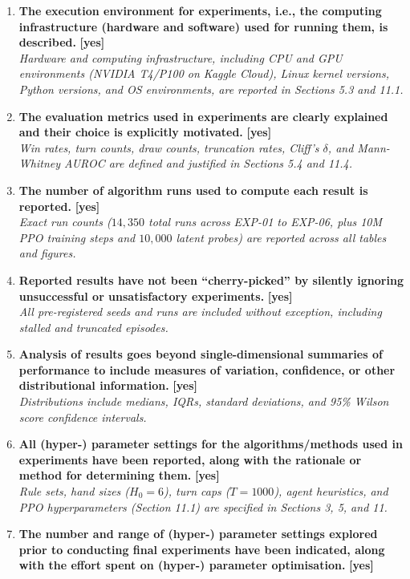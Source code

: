 \documentclass[11pt]{article}
\begin{document}
\begin{enumerate}
  \textit{RNG isolation via Python's Mersenne Twister with explicit seed schedules (10000--60099) detailed in Section 5.}
  \item \textbf{The execution environment for experiments, i.e., the computing infrastructure (hardware and software) used for running them, is described.} \hfill \textbf{[yes]} \\
  \textit{Hardware and computing infrastructure, including CPU and GPU environments (NVIDIA T4/P100 on Kaggle Cloud), Linux kernel versions, Python versions, and OS environments, are reported in Sections 5.3 and 11.1.}
  \item \textbf{The evaluation metrics used in experiments are clearly explained and their choice is explicitly motivated.} \hfill \textbf{[yes]} \\
  \textit{Win rates, turn counts, draw counts, truncation rates, Cliff's $\delta$, and Mann-Whitney AUROC are defined and justified in Sections 5.4 and 11.4.}
  \item \textbf{The number of algorithm runs used to compute each result is reported.} \hfill \textbf{[yes]} \\
  \textit{Exact run counts ($14{,}350$ total runs across EXP-01 to EXP-06, plus 10M PPO training steps and $10{,}000$ latent probes) are reported across all tables and figures.}
  \item \textbf{Reported results have not been ``cherry-picked'' by silently ignoring unsuccessful or unsatisfactory experiments.} \hfill \textbf{[yes]} \\
  \textit{All pre-registered seeds and runs are included without exception, including stalled and truncated episodes.}
  \item \textbf{Analysis of results goes beyond single-dimensional summaries of performance to include measures of variation, confidence, or other distributional information.} \hfill \textbf{[yes]} \\
  \textit{Distributions include medians, IQRs, standard deviations, and 95\% Wilson score confidence intervals.}
  \item \textbf{All (hyper-) parameter settings for the algorithms/methods used in experiments have been reported, along with the rationale or method for determining them.} \hfill \textbf{[yes]} \\
  \textit{Rule sets, hand sizes ($H_0=6$), turn caps ($T=1000$), agent heuristics, and PPO hyperparameters (Section 11.1) are specified in Sections 3, 5, and 11.}
  \item \textbf{The number and range of (hyper-) parameter settings explored prior to conducting final experiments have been indicated, along with the effort spent on (hyper-) parameter optimisation.} \hfill \textbf{[yes]} \\

\end{enumerate}
\end{document}
